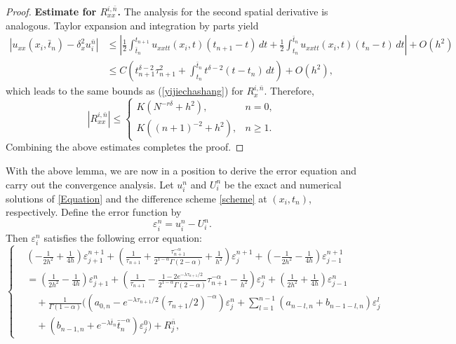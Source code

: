 \documentclass[10pt, reqno]{amsart}
\theoremstyle{remark}
\theoremstyle{definition}
\numberwithin{table}{section}
\begin{document}
\begin{proof}
\medskip
\noindent\textbf{Estimate for $R_{xx}^{i,\bar{n}}$.}
The analysis for the second spatial derivative is analogous. Taylor expansion and integration by parts yield
\begin{align*}
|u_{xx}(x_i,\bar{t}_n) - \delta_x^2 u_i^{\bar{n}}|
&\le
| \frac{1}{2} \int_{\bar{t}_n}^{t_{n+1}} u_{xxtt}(x_i,t)(t_{n+1}-t)\,dt
+ \frac{1}{2} \int_{t_n}^{\bar{t}_n} u_{xxtt}(x_i,t)(t_n - t)\,dt |
+ O(h^2) \\
&\le
C ( t_{n+1}^{\delta-2} \tau_{n+1}^2
+ \int_{t_n}^{\bar{t}_n} t^{\delta-2}(t-t_n)\,dt )
+ O(h^2),
\end{align*}
which leads to the same bounds as (\ref{yijiechashang}) for $R_x^{i,\bar{n}}$. Therefore,
\[
|R_{xx}^{i,\bar{n}}|
\le
\begin{cases}
K (N^{-r\delta} + h^2), & n=0, \\
K ((n+1)^{-2} + h^2), & n \ge 1.
\end{cases}
\]
Combining the above estimates completes the proof.
\end{proof}
With the above lemma, we are now in a position to derive the error equation and carry out the convergence analysis.
Let $u_i^n$ and $U_i^n$ be the exact and numerical solutions of 
\eqref{Equation} and the difference scheme \eqref{scheme} at $(x_i, t_n)$, respectively. 
Define the error function by
\[
\varepsilon_i^n = u_i^n - U_i^n.
\]
Then $\varepsilon_i^n$ satisfies the following error equation:
\begin{equation}
    \left\{
\begin{aligned}
&
(-\tfrac{1}{2 h^2}+\tfrac{1}{4h}) \varepsilon_{j+1}^{n+1}
+ (\tfrac{1}{\tau_{n+1}}+\tfrac{\tau_{n+1}^{-\alpha}}{2^{1-\alpha}\Gamma(2-\alpha)}+\tfrac{1}{h^2}) \varepsilon_j^{n+1}
+ (-\tfrac{1}{2 h^2}-\tfrac{1}{4h}) \varepsilon_{j-1}^{n+1}
 \\
&=
(\tfrac{1}{2 h^2}-\tfrac{1}{4h}) \varepsilon_{j+1}^{n}
+ (\tfrac{1}{\tau_{n+1}}-\tfrac{1-2e^{-\lambda {\tau_{n+1}}/{2}}}{2^{1-\alpha}\Gamma(2-\alpha)}\tau_{n+1}^{-\alpha}-\tfrac{1}{h^2}) \varepsilon_j^{n}
+ (\tfrac{1}{2 h^2}+\tfrac{1}{4h}) \varepsilon_{j-1}^{n} \\
&\quad
+ \tfrac{1}{\Gamma(1-\alpha)}
(
(a_{0, n}-e^{-\lambda {\tau_{n+1}}/{2}} ({\tau_{n+1}}/{2})^{-\alpha}) \varepsilon_j^n
+ \sum_{l=1}^{n-1} (a_{n-l, n}+b_{n-1-l, n}) \varepsilon_j^l\\
&\quad+ (b_{n-1, n}+{e^{-\lambda \bar{t}_n}}{\bar{t}_n^{-\alpha}}) \varepsilon_j^0
)+R_j^{\bar{n}}, \label{converge1}
\end{aligned}
\right.
\end{equation}
\end{document}
